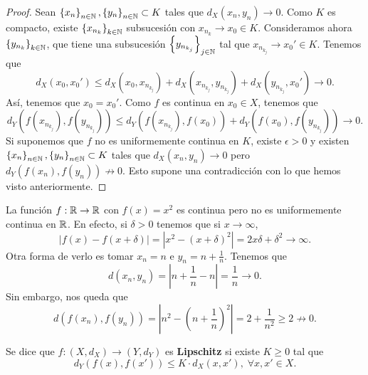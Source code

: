 \begin{proof}
	Sean $\displaystyle \left\{ x_{n}\right\} _{n\in\mathbb{N}}, \left\{ y_{n}\right\} _{n\in\mathbb{N}} \subset K $ tales que $\displaystyle d _{X}\left(x_{n}, y_{n}\right) \to 0 $. Como $\displaystyle K $ es compacto, existe $\displaystyle \left\{ x_{n_{k}}\right\} _{k \in \mathbb{N}}  $ subsucesión con $\displaystyle x_{n_{k}} \to x_{0} \in K$. Consideramos ahora $\displaystyle \left\{ y_{n_{k}}\right\}_{k \in \mathbb{N}}  $, que tiene una subsucesión $\displaystyle \left\{ y_{n_{k_{j}}}\right\} _{j \in \mathbb{N}} $ tal que $\displaystyle x_{n_{k_{j}}} \to x_{0}' \in K $. Tenemos que
	\[d _{X}\left(x_{0}, x_{0}'\right) \leq d _{X}\left(x_{0}, x_{n_{k_{j}}}\right) + d _{X}\left(x_{n_{k_{j}}}, y_{n_{k_{j}}}\right)+ d _{X}\left(y_{n_{k_{j}}}, x_{0}'\right) \to 0 .\]
	Así, tenemos que $\displaystyle x_{0} = x_{0}' $. Como $\displaystyle f $ es continua en $\displaystyle x_{0} \in X $, tenemos que 
	\[ d _{Y}\left(f\left(x_{n_{k_{j}}}\right), f\left(y_{n_{k_{j}}}\right)\right) \leq d _{Y}\left(f\left(x_{n_{k_{j}}}\right), f\left(x_{0}\right)\right) + d _{Y}\left(f\left(x_{0}\right), f\left(y_{n_{k_{j}}}\right)\right) \to 0 .\]
	Si suponemos que $\displaystyle f $ no es uniformemente continua en $\displaystyle K $, existe $\displaystyle \epsilon > 0 $ y existen $\displaystyle \left\{ x_{n}\right\} _{n\in\mathbb{N}}, \left\{ y_{n}\right\} _{n\in\mathbb{N}} \subset K $ tales que $\displaystyle d _{X}\left(x_{n}, y_{n}\right)\to 0 $ pero $\displaystyle d _{Y}\left(f\left(x_{n}\right), f\left(y_{n}\right)\right) \not \to 0 $. Esto supone una contradicción con lo que hemos visto anteriormente. 
\end{proof}
\begin{eg}
La función $\displaystyle f: \mathbb{R} \to \mathbb{R}  $ con $\displaystyle f\left(x\right) = x^{2} $ es continua pero no es uniformemente continua en $\displaystyle \mathbb{R} $. En efecto, si $\displaystyle \delta > 0 $ tenemos que si $\displaystyle x \to \infty $,
\[ \left|f\left(x\right)-f\left(x + \delta \right)\right| = \left|x^{2} - \left(x+ \delta \right)^{2}\right| = 2x\delta + \delta ^{2} \to \infty .\]
Otra forma de verlo es tomar $\displaystyle x_{n} = n $ e $\displaystyle y_{n} = n + \frac{1}{n} $. Tenemos que
\[ d\left(x_{n}, y_{n}\right) = \left|n + \frac{1}{n} - n\right| = \frac{1}{n} \to 0 .\]
Sin embargo, nos queda que
\[ d\left(f\left(x_{n}\right), f\left(y_{n}\right)\right) = \left|n^{2}-\left(n+\frac{1}{n}\right)^{2}\right| = 2 + \frac{1}{n^{2}} \geq 2 \not \to 0 .\]
\end{eg}
\begin{definition}
Se dice que $\displaystyle f : \left(X, d _{X}\right) \to \left(Y, d _{Y}\right) $ es \textbf{Lipschitz} si existe $\displaystyle K \geq 0 $ tal que 
\[d _{Y}\left(f\left(x\right), f\left(x'\right)\right) \leq K \cdot d _{X}\left(x,x'\right), \; \forall x,x' \in X .\]
\end{definition}
